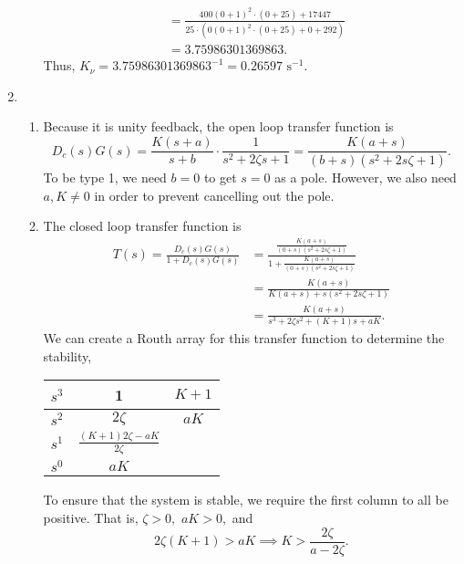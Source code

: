 \documentclass{article}
\numberwithin{equation}{section}
\begin{document}
\begin{enumerate}[label=\textbf{2.\arabic*}]
\begin{enumerate}[label=(\alph*)]
\begin{align}
            &= \frac{400 (0 + 1)^{2} \cdot (0 + 25) + 17447}{25 \cdot (0 (0 + 1)^{2} \cdot (0 + 25) + 0 + 292)} \\ 
            &= 3.75986301369863.
        \end{align}
        Thus, $K_\nu = 3.75986301369863^{-1} = 0.26597\text{ s}^{-1}.$
    \end{enumerate}
    \item \begin{enumerate}[label=(\alph*)]
        \item Because it is unity feedback, the open loop transfer function is
        \begin{equation}
            D_c(s)G(s) = \frac{K(s+a)}{s+b} \cdot \frac{1}{s^2+2\zeta s + 1} = \frac{K (a + s)}{(b + s) (s^{2} + 2 s \zeta + 1)}.
        \end{equation}
        To be type 1, we need $b = 0$ to get $s=0$ as a pole. However, we also need $a,K \neq 0$ in order to prevent cancelling out the pole.
        \item The closed loop transfer function is 
        \begin{align}
            T(s) = \frac{D_c(s)G(s)}{1+D_c(s)G(s)} &= \frac{\frac{K (a + s)}{(0 + s) (s^{2} + 2 s \zeta + 1)}}{1+\frac{K (a + s)}{(0 + s) (s^{2} + 2 s \zeta + 1)}} \\ 
            &= \frac{K (a + s)}{K (a + s) + s (s^{2} + 2 s \zeta + 1)} \\ 
            &= \frac{K (a + s)}{s^{3} + 2 \zeta s^{2}  + (K+1)s + aK} .
        \end{align}
        We can create a Routh array for this transfer function to determine the stability,
        \begin{center}
            {\tabulinesep=1.2mm
            \begin{tabu}{c|c|c}
                 $s^3$ & 1 & $K+1$ \\ \hline 
                 $s^2$ & $2\zeta$ & $aK$ \\ \hline
                 $s^1$ &$ \frac{(K+1)2\zeta - aK}{2\zeta}$ \\ \hline 
                 $s^0$ & $aK$ &
             \end{tabu}
             }
        \end{center}
        To ensure that the system is stable, we require the first column to all be positive. That is, $\zeta > 0,$ $aK>0,$ and 
        \begin{equation}
            2\zeta(K+1) > aK \implies K  > \frac{2\zeta}{a-2\zeta}.

\end{equation}
\end{enumerate}
\end{enumerate}
\end{document}

